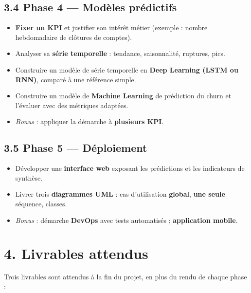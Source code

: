 \documentclass[11pt,a4paper]{article}
\providecommand{\tightlist}{\setlength{\itemsep}{0pt}\setlength{\parskip}{0pt}}
\begin{document}
\subsection{3.4 Phase 4 --- Modèles
prédictifs}\label{phase-4-moduxe8les-pruxe9dictifs}

\begin{itemize}
\tightlist
\item
  \textbf{Fixer un KPI} et justifier son intérêt métier (exemple :
  nombre hebdomadaire de clôtures de comptes).
\item
  Analyser sa \textbf{série temporelle} : tendance, saisonnalité,
  ruptures, pics.
\item
  Construire un modèle de série temporelle en \textbf{Deep Learning
  (LSTM ou RNN)}, comparé à une référence simple.
\item
  Construire un modèle de \textbf{Machine Learning} de prédiction du
  churn et l'évaluer avec des métriques adaptées.
\item
  \emph{Bonus} : appliquer la démarche à \textbf{plusieurs KPI}.
\end{itemize}

\subsection{3.5 Phase 5 --- Déploiement}\label{phase-5-duxe9ploiement}

\begin{itemize}
\tightlist
\item
  Développer une \textbf{interface web} exposant les prédictions et les
  indicateurs de synthèse.
\item
  Livrer trois \textbf{diagrammes UML} : cas d'utilisation
  \textbf{global}, \textbf{une seule} séquence, classes.
\item
  \emph{Bonus} : démarche \textbf{DevOps} avec tests automatisés ;
  \textbf{application mobile}.
\end{itemize}

\section{4. Livrables attendus}\label{livrables-attendus}

Trois livrables sont attendus à la fin du projet, en plus du rendu de
chaque phase :
\end{document}
